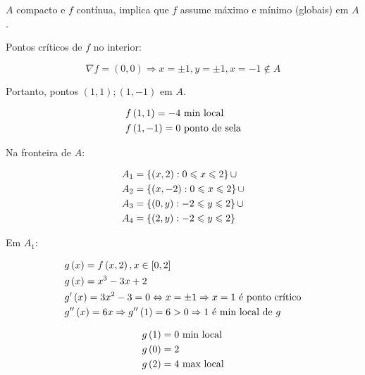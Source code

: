 \documentclass{book}
\begin{document}
\begin{sol}
$A$ compacto e $f$ cont\'inua, implica que $f$ assume m\'aximo e m\'inimo (globais) em $A$.

Pontos cr\'iticos de $f$ no interior:

\[
    \nabla f = \left( {0,0} \right) \Rightarrow x =  \pm 1,y =  \pm 1,x =  - 1 \notin A
\]

Portanto, pontos $\left( {1,1} \right);\left( {1, - 1} \right)$ em $A$.

\[
\begin{gathered}
f\left( {1,1} \right) =  - 4{\text{ min local}} \hfill \\
f\left( {1, - 1} \right) = 0{\text{ ponto de sela}} \hfill \\
\end{gathered}
\]

Na fronteira de $A$:

\[
\begin{gathered}
      A_1  = \left\{ {\left( {x,2} \right):0 \leqslant x \leqslant 2} \right\} \cup  \hfill \\
      A_2  = \left\{ {\left( {x, - 2} \right):0 \leqslant x \leqslant 2} \right\} \cup  \hfill \\
      A_3  = \left\{ {\left( {0,y} \right): - 2 \leqslant y \leqslant 2} \right\} \cup  \hfill \\
      A_4  = \left\{ {\left( {2,y} \right): - 2 \leqslant y \leqslant 2} \right\} \hfill \\
\end{gathered}
\]

Em $A_1$:

\[
\begin{gathered}
      g\left( x \right) = f\left( {x,2} \right),x \in \left[ {0,2} \right] \hfill \\
g\left( x \right) = x^3  - 3x + 2 \hfill \\
      g'\left( x \right) = 3x^2  - 3 = 0 \Leftrightarrow x =  \pm 1 \Rightarrow x = 1{\text{ \'e ponto cr\'itico}} \hfill \\
      g''\left( x \right) = 6x \Rightarrow g''\left( 1 \right) = 6 > 0 \Rightarrow 1{\text{ \'e min local de $g$}} \hfill \\
\end{gathered}
\]

\[
\begin{gathered}
g\left( 1 \right) = 0{\text{ min local}} \hfill \\
g\left( 0 \right) = 2 \hfill \\
g\left( 2 \right) = 4{\text{ max local}} \hfill \\
\end{gathered}
\]


\end{sol}
\end{document}
